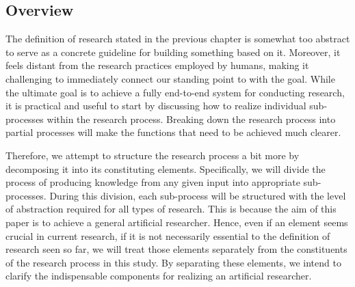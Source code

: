 \documentclass{book}
\begin{document}



\subsection{Overview}


The definition of research stated in the previous chapter is somewhat too abstract to serve as a concrete guideline for building something based on it. Moreover, it feels distant from the research practices employed by humans, making it challenging to immediately connect our standing point to with the goal. While the ultimate goal is to achieve a fully end-to-end system for conducting research, it is practical and useful to start by discussing how to realize individual sub-processes within the research process. Breaking down the research process into partial processes will make the functions that need to be achieved much clearer.

Therefore, we attempt to structure the research process a bit more by decomposing it into its constituting elements. Specifically, we will divide the process of producing knowledge from any given input into appropriate sub-processes. During this division, each sub-process will be structured with the level of abstraction required for all types of research. This is because the aim of this paper is to achieve a general artificial researcher. Hence, even if an element seems crucial in current research, if it is not necessarily essential to the definition of research seen so far, we will treat those elements separately from the constituents of the research process in this study. By separating these elements, we intend to clarify the indispensable components for realizing an artificial researcher. 
\end{document}
